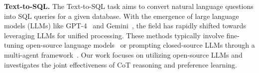 \textbf{Text-to-SQL.}
The Text-to-SQL task aims to convert natural language questions into SQL queries for a given database.
With the emergence of large language models (LLMs) like GPT-4~\citep{openai2024@gpt4-turbo} and Gemini~\citep{DBLP:journals/corr/abs-2312-11805gemini}, the field has rapidly shifted towards leveraging LLMs for unified processing. These methods typically involve fine-tuning open-source language models~\cite{li2024codes, pourreza2024dts-sql, yang2024sense} or prompting closed-source LLMs through a multi-agent framework~\cite{pourreza2024din-sql, gao2024dali-sql, talaei2024chess, pourreza2024chase-sql, wang2024mac-sql}. Our work focuses on utilizing open-source LLMs and investigates the joint effectiveness of CoT reasoning and preference learning.





